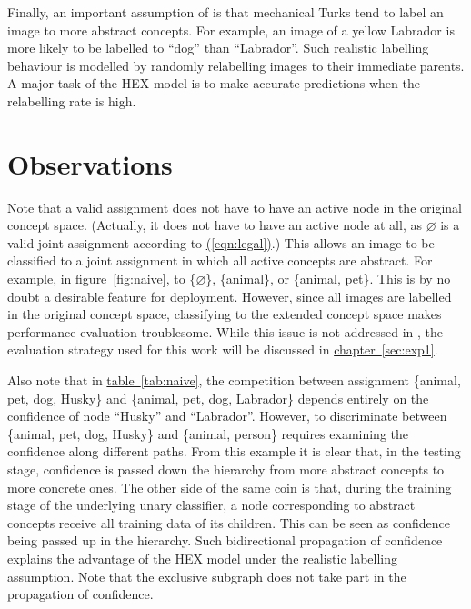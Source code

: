 \documentclass[11pt,a4paper]{book}
\begin{document}
Finally, an important assumption of \cite{deng2014large} is that mechanical Turks tend to label an image to more abstract concepts. For example, an image of a yellow Labrador is more likely to be labelled to ``dog'' than ``Labrador''. Such realistic labelling behaviour is modelled by randomly relabelling images to their immediate parents. A major task of the HEX model is to make accurate predictions when the relabelling rate is high.

\section{Observations}
\label{sec:observ}

Note that a valid assignment does not have to have an active node in the original concept space. (Actually, it does not have to have an active node at all, as $\varnothing$ is a valid joint assignment according to \hyperref[eqn:legal]{(\ref{eqn:legal})}.) This allows an image to be classified to a joint assignment in which all active concepts are abstract. For example, in \hyperref[fig:naive]{figure~\ref{fig:naive}}, to \{$\varnothing$\}, \{animal\}, or \{animal, pet\}. This is by no doubt a desirable feature for deployment. However, since all images are labelled in the original concept space, classifying to the extended concept space makes performance evaluation troublesome. While this issue is not addressed in \cite{deng2014large}, the evaluation strategy used for this work will be discussed in \hyperref[sec:exp1]{chapter~\ref{sec:exp1}}.

Also note that in \hyperref[tab:naive]{table~\ref{tab:naive}}, the competition between assignment \{animal, pet, dog, Husky\} and \{animal, pet, dog, Labrador\} depends entirely on the confidence of node ``Husky'' and ``Labrador''. However, to discriminate between \{animal, pet, dog, Husky\} and \{animal, person\} requires examining the confidence along different paths. From this example it is clear that, in the testing stage, confidence is passed down the hierarchy from more abstract concepts to more concrete ones. The other side of the same coin is that, during the training stage of the underlying unary classifier, a node corresponding to abstract concepts receive all training data of its children. This can be seen as confidence being passed up in the hierarchy. Such bidirectional propagation of confidence explains the advantage of the HEX model under the realistic labelling assumption. Note that the exclusive subgraph does not take part in the propagation of confidence.
\end{document}
